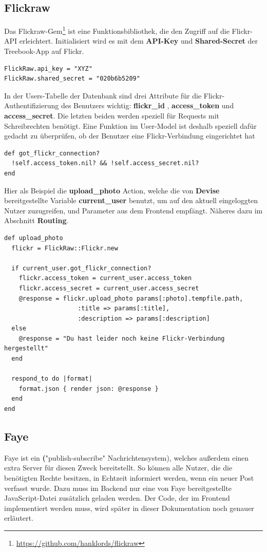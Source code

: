 \documentclass[10pt,a4paper]{book}
\begin{document}
\subsection{Flickraw}
Das Flickraw-Gem\footnote{\href{https://github.com/hanklords/flickraw}{https://github.com/hanklords/flickraw}} ist eine Funktionsbibliothek, 
die den Zugriff auf die Flickr-API erleichtert. Initialisiert wird es mit dem \textbf{API-Key} und \textbf{Shared-Secret} der Treebook-App auf Flickr.
\begin{lstlisting}
FlickRaw.api_key = "XYZ"
FlickRaw.shared_secret = "020b6b5209"
\end{lstlisting}
In der Users-Tabelle der Datenbank sind drei Attribute für die Flickr-Authentifizierung des Benutzers wichtig: \textbf{flickr\_id} , 
\textbf{access\_token} und \textbf{access\_secret}. Die letzten beiden werden speziell für Requests mit Schreibrechten benötigt. Eine Funktion im User-Model ist deshalb speziell dafür gedacht zu überprüfen, ob der Benutzer eine Flickr-Verbindung eingerichtet hat
\begin{lstlisting}
def got_flickr_connection?
  !self.access_token.nil? && !self.access_secret.nil?
end
\end{lstlisting}
Hier als Beispiel die \textbf{upload\_photo} Action, welche die von \textbf{Devise} bereitgestellte Variable \textbf{current\_user} benutzt,
um auf den aktuell eingeloggten Nutzer zuzugreifen, und Parameter aus dem Frontend empfängt. Näheres dazu im Abschnitt \textbf{Routing}.
\begin{lstlisting}
def upload_photo
  flickr = FlickRaw::Flickr.new

  if current_user.got_flickr_connection?
    flickr.access_token = current_user.access_token
    flickr.access_secret = current_user.access_secret
    @response = flickr.upload_photo params[:photo].tempfile.path, 
    				:title => params[:title], 
    				:description => params[:description]
  else
    @response = "Du hast leider noch keine Flickr-Verbindung hergestellt"
  end

  respond_to do |format|
    format.json { render json: @response }
  end
end
\end{lstlisting}
\subsection{Faye}
Faye ist ein \textbf("publish-subscribe" Nachrichtensystem), welches außerdem einen extra Server für diesen Zweck bereitstellt. So können alle Nutzer, die die benötigten Rechte besitzen, in Echtzeit informiert werden, wenn ein neuer Post verfasst wurde. Dazu muss im Backend nur eine von Faye bereitgestellte JavaScript-Datei zusätzlich geladen werden. Der Code, der im Frontend implementiert werden muss, wird später in dieser Dokumentation noch genauer erläutert.
\end{document}
